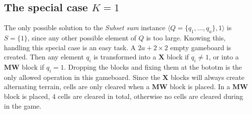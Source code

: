 \subsection{The special case $K = 1$}
The only possible solution to the \textit{Subset sum} instance $\langle Q = \{q_1, \ldots, q_a\}, 1 \rangle$ is $S = \{1\}$, since any other possible element of $Q$ is too large. Knowing this, handling this special case is an easy task. A $2a+2 \times 2$ empty gameboard is created. Then any element $q_i$ is transformed into a $\mathbf{X}$ block if $q_i \not = 1$, or into a $\mathbf{MW}$ block if $q_i = 1$. Dropping the blocks and fixing them at the bototm is the only allowed operation in this gameboard. Since the $\mathbf{X}$ blocks will always create alternating terrain, cells are only cleared when a $\mathbf{MW}$ block is placed. In a $\mathbf{MW}$ block is placed, 4 cells are cleared in total, otherwise no cells are cleared during in the game.

\begin{figure}[H]
    \centering
\end{figure}
